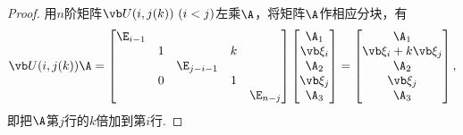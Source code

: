 \begin{property}
\begin{proof}
用\(n\)阶矩阵\(\P(i,j(k))\ (i < j)\)左乘\(\A\)，将矩阵\(\A\)作相应分块，有\[
	\P(i,j(k)) \A = \begin{bmatrix}
		\E_{i-1} \\
		& 1 & & k \\
		& & \E_{j-i-1} \\
		& 0 & & 1 \\
		& & & & \E_{n-j}
	\end{bmatrix}
	\begin{bmatrix}
		\A_1 \\ \a_i \\ \A_2 \\ \a_j \\ \A_3
	\end{bmatrix}
	= \begin{bmatrix}
		\A_1 \\ \a_i + k \a_j \\ \A_2 \\ \a_j \\ \A_3
	\end{bmatrix},
\]
即把\(\A\)第\(j\)行的\(k\)倍加到第\(i\)行.
\end{proof}
\end{property}
